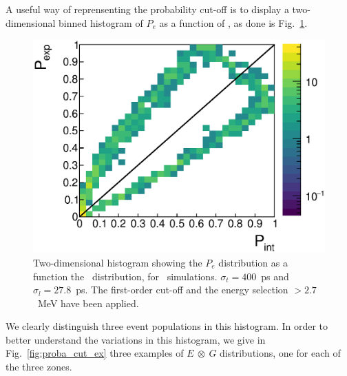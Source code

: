 A useful way of reprensenting the probability cut-off is to display a two-dimensional binned histogram of $P_{e}$ as a function of \Pint, as done is Fig.~\ref{fig:biplot_Pexp_Pint}.
\begin{figure}[!h]
  \centering
  \includegraphics[width=15cm]{timedifference/fig_timediff/PintVSPexp_208Tl.eps}
  \caption{Two-dimensional histogram showing the $P_{e}$ distribution as a function the \Pint\ distribution, for \Tl\ simulations.
    $\sigma_{t}=400$~ps and $\sigma_{l}=27.8$~ps.
    The first-order cut-off and the energy selection $>2.7$~MeV have been applied.
    \label{fig:biplot_Pexp_Pint}}
\end{figure}
We clearly distinguish three event populations in this histogram.
In order to better understand the variations in this histogram, we give in Fig.~\ref{fig:proba_cut_ex} three examples of $E~\otimes~G$ distributions, one for each of the three zones.
